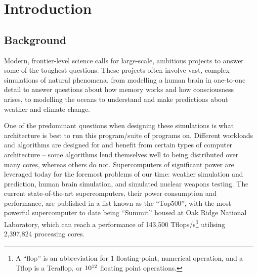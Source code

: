\documentclass[conference]{IEEEtran}
\begin{document}
\section{Introduction}\label{introduction}

\subsection{Background}

Modern, frontier-level science calls for large-scale, ambitious projects to answer some of the toughest questions. These projects often involve vast, complex simulations of natural phenomena, from modelling a human brain in one-to-one detail to answer questions about how memory works and how consciousness arises, to modelling the oceans to understand and make predictions about weather and climate change.

One of the predominant questions when designing these simulations is what architecture is best to run this program/suite of programs on. Different workloads and algorithms are designed for and benefit from certain types of computer architecture – some algorithms lend themselves well to being distributed over many cores, whereas others do not. Supercomputers of significant power are leveraged today for the foremost problems of our time: weather simulation and prediction\cite{metoffice}, human brain simulation\cite{humanbrain}, and simulated nuclear weapons testing\cite{nuclear}. The current state-of-the-art supercomputers, their power consumption and performance, are published in a list known as the ``Top500”\cite{top500}, with the most powerful supercomputer to date being ``Summit” housed at Oak Ridge National Laboratory, which can reach a performance of 143,500 Tflops/s\footnote{A ``flop” is an abbreviation for 1 floating-point, numerical operation, and a Tflop is a Teraflop, or $10\textsuperscript{12}$ floating point operations.} utilising 2,397,824 processing cores.
\end{document}
